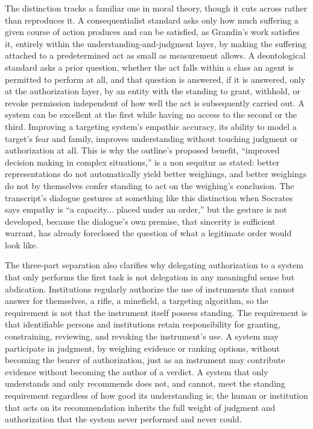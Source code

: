 \documentclass[11pt]{article}
\begin{document}
The distinction tracks a familiar one in moral theory, though it cuts across rather than reproduces it. A consequentialist standard asks only how much suffering a given course of action produces and can be satisfied, as Grandin's work satisfies it, entirely within the understanding-and-judgment layer, by making the suffering attached to a predetermined act as small as measurement allows. A deontological standard asks a prior question, whether the act falls within a class an agent is permitted to perform at all, and that question is answered, if it is answered, only at the authorization layer, by an entity with the standing to grant, withhold, or revoke permission independent of how well the act is subsequently carried out. A system can be excellent at the first while having no access to the second or the third. Improving a targeting system's empathic accuracy, its ability to model a target's fear and family, improves understanding without touching judgment or authorization at all. This is why the outline's proposed benefit, ``improved decision making in complex situations,'' is a non sequitur as stated: better representations do not automatically yield better weighings, and better weighings do not by themselves confer standing to act on the weighing's conclusion. The transcript's dialogue gestures at something like this distinction when Socrates says empathy is ``a capacity... placed under an order,'' but the gesture is not developed, because the dialogue's own premise, that sincerity is sufficient warrant, has already foreclosed the question of what a legitimate order would look like.

The three-part separation also clarifies why delegating authorization to a system that only performs the first task is not delegation in any meaningful sense but abdication. Institutions regularly authorize the use of instruments that cannot answer for themselves, a rifle, a minefield, a targeting algorithm, so the requirement is not that the instrument itself possess standing. The requirement is that identifiable persons and institutions retain responsibility for granting, constraining, reviewing, and revoking the instrument's use. A system may participate in judgment, by weighing evidence or ranking options, without becoming the bearer of authorization, just as an instrument may contribute evidence without becoming the author of a verdict. A system that only understands and only recommends does not, and cannot, meet the standing requirement regardless of how good its understanding is; the human or institution that acts on its recommendation inherits the full weight of judgment and authorization that the system never performed and never could.
\end{document}

